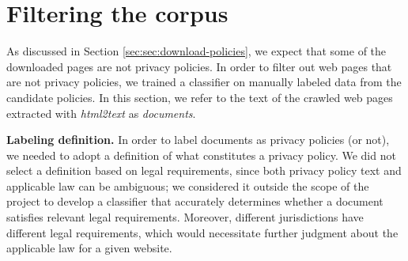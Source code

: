 \section{Filtering the corpus}
\label{sec:classifier}

As discussed in Section \ref{sec:sec:download-policies}, we expect that some of the downloaded pages are not privacy policies. In order to filter out web pages that are not privacy policies, we trained a classifier on manually labeled data from the candidate policies. In this section, we refer to the text of the crawled web pages extracted with \emph{html2text} as \textit{documents}.

\textbf{Labeling definition.}
\label{sec:sec:pp-definition}
In order to label documents as privacy policies (or not), we needed to adopt a definition of what constitutes a privacy policy. We did not select a definition based on legal requirements, since both privacy policy text and applicable law can be ambiguous; we considered it outside the scope of the project to develop a classifier that accurately determines whether a document satisfies relevant legal requirements. Moreover, different jurisdictions have different legal requirements, which would necessitate further judgment about the applicable law for a given website.

